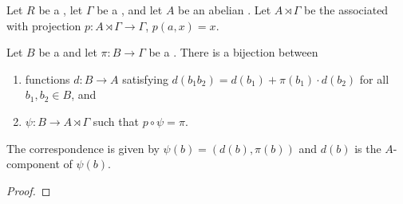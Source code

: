 \begin{proposition} \label{proposition:universal_property_of_semidirect_product_for_derivations}
    Let $R$ be a , let $\Gamma$ be a , and let $A$ be an abelian . Let $A \rtimes \Gamma$ be the associated  with projection $p: A \rtimes \Gamma \to \Gamma$, $p(a,x) = x$.

    Let $B$ be a  and let $\pi: B \to \Gamma$ be a .
    There is a bijection between
    \begin{enumerate}
        \item functions $d: B \to A$ satisfying $d(b_1 b_2) = d(b_1) + \pi(b_1) \cdot d(b_2)$ for all $b_1, b_2 \in B$, and
        \item {} $\psi: B \to A \rtimes \Gamma$ such that $p \circ \psi = \pi$.
    \end{enumerate}
    The correspondence is given by $\psi(b) = (d(b), \pi(b))$ and $d(b)$ is the $A$-component of $\psi(b)$.
\end{proposition}
\begin{proof}
    \TODO{}
\end{proof}
